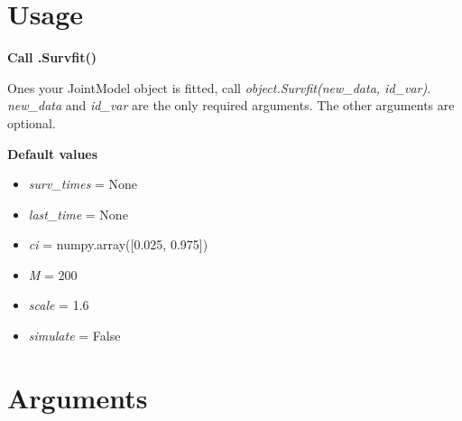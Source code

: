 \documentclass[11pt, oneside]{article}   	%
\providecommand{\tightlist}{%
      \setlength{\itemsep}{0pt}\setlength{\parskip}{0pt}}
\begin{document}
\section{Usage}\label{usage}

\textbf{Call .Survfit()}

Ones your JointModel object is fitted, call
\emph{object.Survfit(new\_data, id\_var)}. \emph{new\_data} and
\emph{id\_var} are the only required arguments. The other arguments are
optional.

\textbf{Default values}

\begin{itemize}
\tightlist
\item
  \emph{surv\_times} = None
\item
  \emph{last\_time} = None
\item
  \emph{ci} = numpy.array({[}0.025, 0.975{]})
\item
  \emph{M} = 200
\item
  \emph{scale} = 1.6
\item
  \emph{simulate} = False
\end{itemize}









\section{Arguments}\label{arguments}
\end{document}
